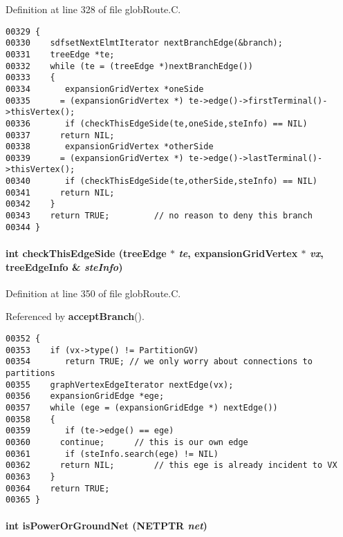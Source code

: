 Definition at line 328 of file glob\-Route.C.\small\begin{verbatim}00329 {
00330    sdfsetNextElmtIterator nextBranchEdge(&branch);
00331    treeEdge *te;
00332    while (te = (treeEdge *)nextBranchEdge())
00333    {
00334       expansionGridVertex *oneSide
00335      = (expansionGridVertex *) te->edge()->firstTerminal()->thisVertex();
00336       if (checkThisEdgeSide(te,oneSide,steInfo) == NIL)
00337      return NIL;
00338       expansionGridVertex *otherSide
00339      = (expansionGridVertex *) te->edge()->lastTerminal()->thisVertex();
00340       if (checkThisEdgeSide(te,otherSide,steInfo) == NIL)
00341      return NIL;
00342    }
00343    return TRUE;         // no reason to deny this branch
00344 }
\end{verbatim}\normalsize 
\label{globRoute.C_a1}
\paragraph{\setlength{\rightskip}{0pt plus 5cm}int check\-This\-Edge\-Side (tree\-Edge $\ast$ {\em te}, {\bf expansion\-Grid\-Vertex} $\ast$ {\em vx}, tree\-Edge\-Info \& {\em ste\-Info})\hspace{0.3cm}{\tt  [static]}}\hfill



Definition at line 350 of file glob\-Route.C.

Referenced by {\bf accept\-Branch}().\small\begin{verbatim}00352 {
00353    if (vx->type() != PartitionGV)
00354       return TRUE; // we only worry about connections to partitions
00355    graphVertexEdgeIterator nextEdge(vx);
00356    expansionGridEdge *ege;
00357    while (ege = (expansionGridEdge *) nextEdge())
00358    {
00359       if (te->edge() == ege)
00360      continue;      // this is our own edge
00361       if (steInfo.search(ege) != NIL)
00362      return NIL;        // this ege is already incident to VX
00363    }
00364    return TRUE;
00365 }
\end{verbatim}\normalsize 
\label{globRoute.C_a3}
\paragraph{\setlength{\rightskip}{0pt plus 5cm}int is\-Power\-Or\-Ground\-Net (NETPTR {\em net})\hspace{0.3cm}{\tt  [static]}}\hfill



